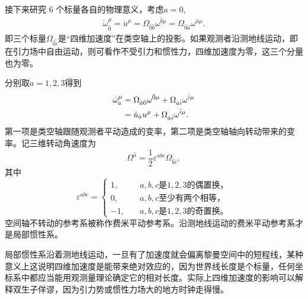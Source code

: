 \documentclass[11pt, a4paper, oneside, onecolumn]{ctexart}
\numberwithin{equation}{subsection}
\begin{document}
接下来研究 6 个标量各自的物理意义，考虑$a=0$,
\begin{align}
\dot{\omega}^{\mu}_{\hat{0}}=\dot{u}^{\mu}=\Omega_{\hat{0}\hat{b}}\omega^{\hat{b}\mu}=\Omega_{\hat{0}\hat{a}}\omega^{\hat{a}\mu}.
\end{align}
即三个标量$\Omega_{\hat{0}\hat{i}}$是“四维加速度”在类空轴上的投影。如果观测者沿测地线运动，即在引力场中自由运动，则可看作不受引力和惯性力，四维加速度为零，这三个分量也为零。

分别取$a=1,2,3$得到
\begin{align}
\dot{\omega}^{\mu}_{\hat{a}}&=\Omega_{\hat{a}\hat{0}}\omega^{\hat{0}\mu}+\Omega_{\hat{a}\hat{i}}\omega^{\hat{i}\mu}\notag\\
&=\dot{u}_{\hat{a}}u^{\mu}+\Omega_{\hat{a}\hat{i}}\omega^{\hat{i}\mu}.
\end{align}
第一项是类空轴跟随观测者平动造成的变率，第二项是类空轴轴向转动带来的变率。记三维转动角速度为
\begin{equation}
\Omega^{\hat{a}}=\frac{1}{2}\varepsilon^{abc}\Omega_{\hat{b}\hat{c}},
\end{equation}
其中
\begin{equation}
\varepsilon^{abc}=
\begin{cases}
1,&\quad a,b,c\text{是}1,2,3\text{的偶置换，}\\
0,&\quad a,b,c\text{至少有两个相等，}\\
-1,&\quad a,b,c\text{是}1,2,3\text{的奇置换。}
\end{cases}
\end{equation}
空间轴不转动的参考系被称作费米平动参考系。沿测地线运动的费米平动参考系才是局部惯性系。

局部惯性系沿着测地线运动，一旦有了加速度就会偏离黎曼空间中的短程线，某种意义上这说明四维加速度是能带来绝对效应的，因为世界线长度是个标量，任何坐标系中都应当能用观测量理论确定它的相对长度。实际上四维加速度的影响可以解释双生子佯谬，因为引力势或惯性力场大的地方时钟走得慢。
\end{document}
